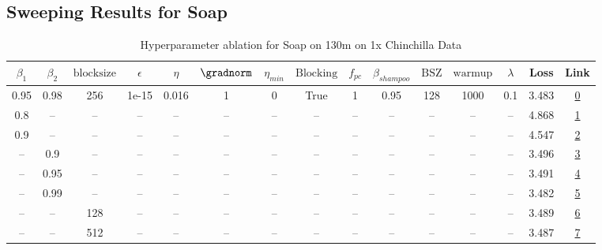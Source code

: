 \subsection{Sweeping Results for Soap}%
\begin{table}[H]
\centering
\caption{Hyperparameter ablation for Soap on 130m on 1x Chinchilla Data}
\label{tab:ablation_soap_130m_on_1x_chinchilla_data}
\begin{tabular}{ccccccccccccccc}
\toprule
$\beta_1$ & $\beta_2$ & $\mathrm{block size}$ & $\epsilon$ & $\eta$ & $\gradnorm$ & $\eta_{min}$ & $\mathrm{Blocking}$ & $f_{pc}$ & $\beta_{shampoo}$ & $\mathrm{BSZ}$ & $\mathrm{warmup}$ & $\lambda$ & Loss & Link \\
\midrule
0.95 & 0.98 & 256 & 1e-15 & 0.016 & 1 & 0 & True & 1 & 0.95 & 128 & 1000 & 0.1 & 3.483 & \href{https://wandb.ai/stanford-mercury/optimizer-scaling/runs/sweep-130m-2B-soaplff7de8lr0.016-wd0.1-minlr0-warmup1000-b10.95--f08df8}{0} \\
\midrule
0.8 & -- & -- & -- & -- & -- & -- & -- & -- & -- & -- & -- & -- & 4.868 & \href{https://wandb.ai/stanford-mercury/optimizer-scaling/runs/sweep-130m-2B-soapl0e72d4lr0.016-wd0.1-minlr0-warmup1000-b10.8-b-24a77a}{1} \\
0.9 & -- & -- & -- & -- & -- & -- & -- & -- & -- & -- & -- & -- & 4.547 & \href{https://wandb.ai/stanford-mercury/optimizer-scaling/runs/sweep-130m-2B-soaplf498b0lr0.016-wd0.1-minlr0-warmup1000-b10.9-b-a0623f}{2} \\
-- & 0.9 & -- & -- & -- & -- & -- & -- & -- & -- & -- & -- & -- & 3.496 & \href{https://wandb.ai/stanford-mercury/optimizer-scaling/runs/sweep-130m-2B-soaple0af61lr0.016-wd0.1-minlr0-warmup1000-b10.95--e189bd}{3} \\
-- & 0.95 & -- & -- & -- & -- & -- & -- & -- & -- & -- & -- & -- & 3.491 & \href{https://wandb.ai/stanford-mercury/optimizer-scaling/runs/sweep-130m-2B-soapl8015a9lr0.016-wd0.1-minlr0-warmup1000-b10.95--a9e9d5}{4} \\
-- & 0.99 & -- & -- & -- & -- & -- & -- & -- & -- & -- & -- & -- & 3.482 & \href{https://wandb.ai/stanford-mercury/optimizer-scaling/runs/sweep-130m-2B-soapla4071flr0.016-wd0.1-minlr0-warmup1000-b10.95--f307f3}{5} \\
-- & -- & 128 & -- & -- & -- & -- & -- & -- & -- & -- & -- & -- & 3.489 & \href{https://wandb.ai/stanford-mercury/optimizer-scaling/runs/sweep-130m-2B-soaplc51c66lr0.016-wd0.1-minlr0-warmup1000-b10.95--a8e71b}{6} \\
-- & -- & 512 & -- & -- & -- & -- & -- & -- & -- & -- & -- & -- & 3.487 & \href{https://wandb.ai/stanford-mercury/optimizer-scaling/runs/sweep-130m-2B-soapl55f9b8lr0.016-wd0.1-minlr0-warmup1000-b10.95--e77aea}{7} \\

\end{tabular}
\end{table}
